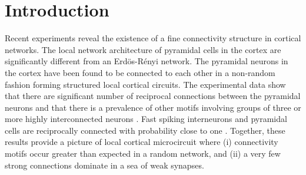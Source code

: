 
\section{Introduction}

Recent experiments reveal the existence of a fine connectivity structure in cortical networks. The local network architecture of pyramidal cells in the cortex are significantly different from an Erdös-Rényi network. The pyramidal neurons in the cortex have been found to be connected to each other in a non-random fashion forming structured local cortical circuits. The experimental data show that there are significant number of reciprocal connections between the pyramidal neurons and that there is a prevalence of other motifs involving groups of three or more highly interconnected neurons \cite{markram1997,thomson2002, Song2005, Perin2011}. Fast spiking interneurons and pyramidal cells are reciprocally connected with probability close to one \cite{Yoshimura2005}. Together, these results provide a picture of local cortical microcircuit where (i) connectivity motifs occur greater than expected in a random network, and (ii) a very few strong connections dominate in a sea of weak synapses.\\

